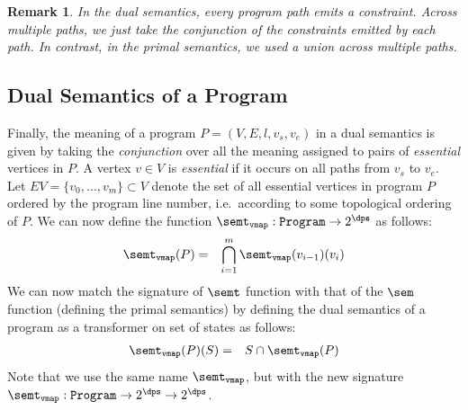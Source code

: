 \documentclass[preprint]{sig-alternate-05-2015}
\newtheorem{remark}{Remark}
\def\vmap{{\tt{vmap}}}
\def\paths{{\tt{Paths}}}
\def\assume{{\tt{assume}}}
\begin{document}
{\begin{remark}
In the dual semantics, every program path emits a constraint.
Across multiple paths, we just take the conjunction of the constraints emitted
by each path. In contrast, in the primal semantics, we used a union
across multiple paths.
\end{remark}


\subsection{Dual Semantics of a Program}

Finally,
the meaning of a program $P = (V,E,l,v_s,v_e)$ in
a dual semantics is given by
taking the {\em{conjunction}} over all the meaning
assigned to pairs of {\em{essential}} vertices in $P$.
A vertex $v\in V$ is {\em{essential}} if it occurs on
all paths from $v_s$ to $v_e$.
Let $EV = \{v_0,\ldots,v_m\}\subset V$ denote the set of all essential vertices
in program $P$ ordered by the program line number, i.e.\ according 
to some topological ordering of $P$.
We can now define the function
$\semt_\vmap: \mathtt{Program} \rightarrow 2^\dps$ as follows:
\begin{eqnarray}
 \semt_\vmap(P) & = &
  \bigcap_{i=1}^m \semt_\vmap(v_{i-1})(v_i)
 \label{eqn:dualProgram}
\end{eqnarray}
We can now match the signature of $\semt$ function with that of the
$\sem$ function (defining the primal semantics) by defining the dual
semantics of a program as a transformer on set of states as follows:
\begin{eqnarray}
 \semt_\vmap(P)(S) & = & S \cap \semt_\vmap(P)
\end{eqnarray}
Note that we use the same name $\semt_\vmap$, but with the new signature
$\semt_\vmap: \mathtt{Program} \rightarrow 2^{\dps} \rightarrow 2^\dps$.

\endignore}
\end{document}

